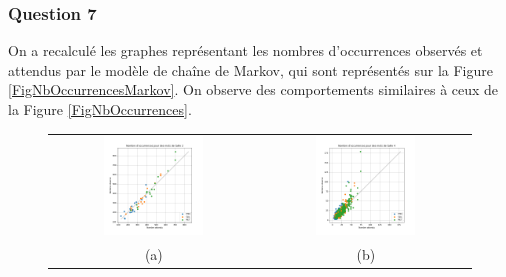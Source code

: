 \documentclass[a4paper,12pt]{article}
\begin{document}
\subsubsection*{Question 7}

On a recalculé les graphes représentant les nombres d'occurrences observés et attendus par le modèle de chaîne de Markov, qui sont représentés sur la Figure \ref{FigNbOccurrencesMarkov}. On observe des comportements similaires à ceux de la Figure \ref{FigNbOccurrences}.

\begin{figure}
\centering
\begin{tabular}{@{} c @{} c @{}}
\includegraphics[width=0.5\textwidth]{Figures/graphe_occurrences_Markov_2.png} & \includegraphics[width=0.5\textwidth]{Figures/graphe_occurrences_Markov_4.png} \tabularnewline
(a) & (b) \tabularnewline

\end{tabular}
\end{figure}
\end{document}
